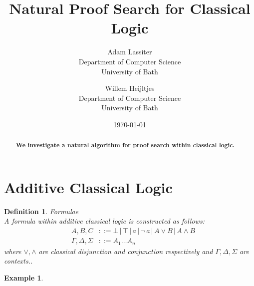 \documentclass{article}
\title{Natural Proof Search for Classical Logic}
\author{Adam Lassiter\\Department of Computer Science\\University of Bath \and Willem Heijltjes\\Department of Computer Science\\University of Bath}
\date{\today}
\def\defeq{::=}
\theoremstyle{indented}
\newtheorem{definition}[sec-ctr]{Definition}
\newtheorem*{example*}{Example}
\begin{document}
    \maketitle
    \begin{abstract}
        \textbf{We investigate a natural algorithm for proof search within classical logic.}
    \end{abstract}

    \section{Additive Classical Logic}

        \begin{definition}{Formulae\\}
            A \textit{formula} within additive classical logic is constructed as follows:
            \begin{align*}
                \quad A, B, C                &\defeq \bot \,|\, \top \,|\, a \,|\, \neg\, a \,|\, A \vee B \,|\, A \wedge B \\
                \quad \Gamma, \Delta, \Sigma &\defeq A_1 \ldots A_n
            \end{align*}
            where $\vee, \wedge$ are classical disjunction and conjunction respectively and $\Gamma, \Delta, \Sigma$ are contexts..
        \end{definition}

        \begin{example*}
        \end{example*}
\end{document}
